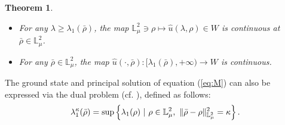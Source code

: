 \documentclass[12pt,thmsa]{article}
\newtheorem{theorem}{Theorem}[section]
\begin{document}
\begin{theorem}
\begin{enumerate}
\begin{itemize}
\item For any $\lambda \geq \lambda _{1}(\bar{\rho})$, the map $\mathbb{L}%
_{\mu }^{2}\ni \rho \mapsto \hat{u}(\lambda ,\rho )\in W$ is continuous at $%
\bar{\rho}\in \mathbb{L}_{\mu }^{2}$.

\item For any $\bar{\rho}\in \mathbb{L}_{\mu }^{2}$, the map $\hat{u}(\cdot ,%
\bar{\rho})\colon \lbrack \lambda _{1}(\bar{\rho}),+\infty )\rightarrow W$
is continuous.
\end{itemize}
\end{enumerate}
\end{theorem}

The ground state and principal solution of equation (\ref{eq:M}) can also be
expressed via the dual problem (cf. \cite{egnel, EgorKondr, ValIl2025, Qi,
Wei, ZhangM}), defined as follows:
\begin{equation}
\lambda _{1}^{\kappa }(\bar{\rho})=\sup \left\{ \lambda _{1}(\rho )\text{ }|%
\text{\ }\rho \in \mathbb{L}_{\mu }^{2},\ \Vert \bar{\rho}-\rho \Vert _{%
\mathbb{L}_{\mu }^{2}}^{2}=\kappa \right\} .  \label{eq-10}
\end{equation}
\end{document}
